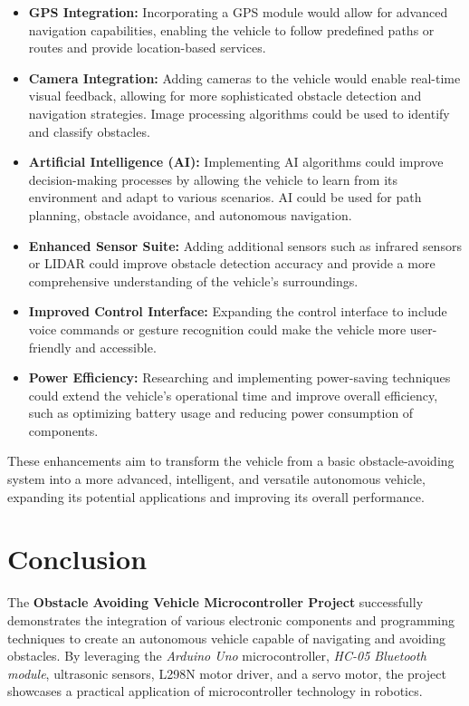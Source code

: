 \documentclass[12pt,a4paper]{report}
\begin{document}
\begin{itemize}
    \item \textbf{GPS Integration:} Incorporating a GPS module would allow for advanced navigation capabilities, enabling the vehicle to follow predefined paths or routes and provide location-based services.
    \item \textbf{Camera Integration:} Adding cameras to the vehicle would enable real-time visual feedback, allowing for more sophisticated obstacle detection and navigation strategies. Image processing algorithms could be used to identify and classify obstacles.
    \item \textbf{Artificial Intelligence (AI):} Implementing AI algorithms could improve decision-making processes by allowing the vehicle to learn from its environment and adapt to various scenarios. AI could be used for path planning, obstacle avoidance, and autonomous navigation.
    \item \textbf{Enhanced Sensor Suite:} Adding additional sensors such as infrared sensors or LIDAR could improve obstacle detection accuracy and provide a more comprehensive understanding of the vehicle's surroundings.
    \item \textbf{Improved Control Interface:} Expanding the control interface to include voice commands or gesture recognition could make the vehicle more user-friendly and accessible.
    \item \textbf{Power Efficiency:} Researching and implementing power-saving techniques could extend the vehicle’s operational time and improve overall efficiency, such as optimizing battery usage and reducing power consumption of components.
\end{itemize}

These enhancements aim to transform the vehicle from a basic obstacle-avoiding system into a more advanced, intelligent, and versatile autonomous vehicle, expanding its potential applications and improving its overall performance.

\chapter*{Conclusion}

The \textbf{Obstacle Avoiding Vehicle Microcontroller Project} successfully demonstrates the integration of various electronic components and programming techniques to create an autonomous vehicle capable of navigating and avoiding obstacles. By leveraging the \textit{Arduino Uno} microcontroller, \textit{HC-05 Bluetooth module}, ultrasonic sensors, L298N motor driver, and a servo motor, the project showcases a practical application of microcontroller technology in robotics.
\end{document}
